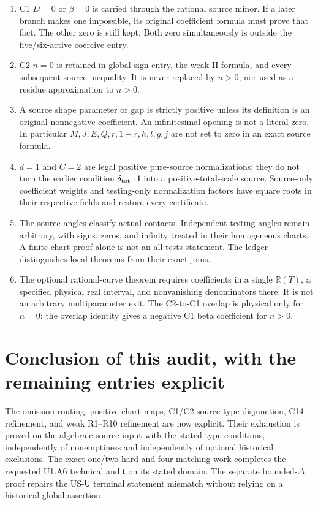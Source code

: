 \documentclass[11pt]{article}
\newcommand{\R}{\mathbb R}
\newcommand{\I}{\mathsf I}
\newcommand{\U}{\mathsf U}
\begin{document}
\begin{enumerate}
\item C1 $D=0$ or $\beta=0$ is carried through the rational source
minor. If a later branch makes one impossible, its original coefficient
formula must prove that fact. The other zero is still kept. Both zero
simultaneously is outside the five/six-active coercive entry.
\item C2 $n=0$ is retained in global sign entry, the weak-II formula,
and every subsequent source inequality. It is never replaced by
$n>0$, nor used as a residue approximation to $n>0$.
\item A source shape parameter or gap is strictly positive unless its
definition is an original nonnegative coefficient. An infinitesimal
opening is not a literal zero. In particular $M,J,E,Q,r,1-r,h,l,g,j$
are not set to zero in an exact source formula.
\item $d=1$ and $C=2$ are legal positive pure-source normalizations;
they do not turn the earlier condition $\delta_{\rm tot}:\I$ into
a positive-total-scale source. Source-only coefficient weights and
testing-only normalization factors have square roots in their respective
fields and restore every certificate.
\item The source angles classify actual contacts. Independent testing
angles remain arbitrary, with signs, zeros, and infinity treated in their
homogeneous charts. A finite-chart proof alone is not an all-tests
statement. The ledger distinguishes local theorems from their exact joins.
\item The optional rational-curve theorem requires coefficients in a
single $\R(T)$, a specified physical real interval, and nonvanishing
denominators there. It is not an arbitrary multiparameter exit.
The C2-to-C1 overlap is physical only for $n=0$: the overlap identity
gives a negative C1 beta coefficient for $n>0$.
\end{enumerate}

\section{Conclusion of this audit, with the remaining entries explicit}

The omission routing, positive-chart maps, C1/C2 source-type disjunction,
C14 refinement, and weak R1--R10 refinement are now explicit. Their
exhaustion is proved on the algebraic source input with the stated type
conditions, independently of nonemptiness and independently of optional
historical exclusions. The exact one/two-hard and four-matching work
completes the requested U1.A6 technical audit on its stated domain.
The separate bounded-$\Delta$ proof repairs the US-$\U$ terminal
statement mismatch without relying on a historical global assertion.
\end{document}
